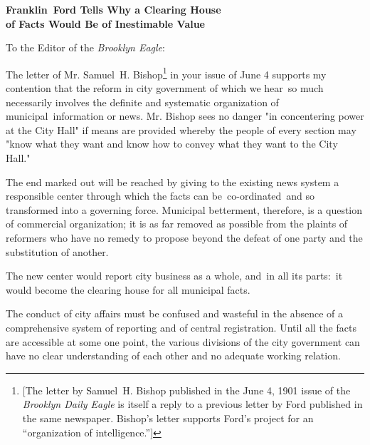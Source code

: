 \documentclass[openany,nobib]{tufte-book}
\begin{document}
\vspace{0.5in}

\begin{center}

\begin{spacing}{1.25}


    
{\LARGE\bfseries Franklin~Ford Tells Why a Clearing House\\of Facts Would Be
of Inestimable
Value}

\end{spacing}

\end{center}

\vspace{0.15in}

\noindent To the Editor of the \emph{Brooklyn Eagle}:~~

\vspace{0.05in}

The letter of Mr. Samuel~H. Bishop\footnote{{[}The letter by Samuel~H.
  Bishop published in the June 4, 1901 issue of the \emph{Brooklyn Daily
  Eagle} is itself a reply to a previous letter by Ford published in the
  same newspaper. Bishop's letter supports Ford's project for an
  ``organization of intelligence.''{]}} in your issue of June 4 supports
my contention that the reform in city government of which we hear~so
much necessarily involves the definite and systematic organization of
municipal~information or news. Mr. Bishop sees no danger "in
concentering power at the City Hall" if means are provided whereby the
people of every section may "know what they want and know how to convey
what they want to the City Hall."~

The end marked out will be reached by giving to the existing news system
a responsible center through which the facts can be~co-ordinated~and so
transformed into a governing force. Municipal betterment, therefore, is
a question of commercial organization; it is as far removed as possible
from the plaints of reformers who have no remedy to propose beyond the
defeat of one party and the substitution of another.~

The new center would report city business as a whole, and~in all its
parts:~it would become the clearing house for all municipal facts.~~

The conduct of city affairs must be confused and wasteful in the absence
of a comprehensive system of reporting and of central registration.
Until all the facts are accessible at some one point, the various
divisions of the city government can have no clear understanding of each
other and no adequate working relation.~
\end{document}
